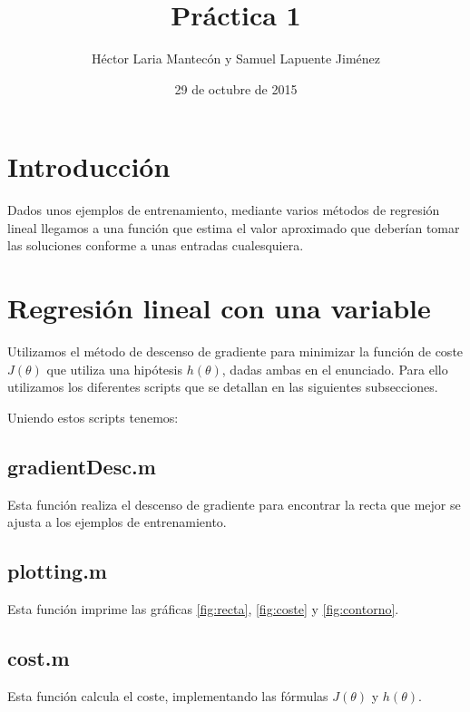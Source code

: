 \documentclass{article}
\title{Práctica 1}
\author{Héctor Laria Mantecón y Samuel Lapuente Jiménez}
\date{29 de octubre de 2015}
\begin{document}
\maketitle
\section{Introducción}
Dados unos ejemplos de entrenamiento, mediante varios métodos de regresión lineal llegamos a una función que estima el valor aproximado que deberían tomar las soluciones conforme a unas entradas cualesquiera.

\section{Regresión lineal con una variable}
Utilizamos el método de descenso de gradiente para minimizar la función de coste $J(\theta)$ que utiliza una hipótesis $h(\theta)$, dadas ambas en el enunciado. Para ello utilizamos los diferentes scripts que se detallan en las siguientes subsecciones.

Uniendo estos scripts tenemos:

\pagebreak

\subsection{gradientDesc.m}
Esta función realiza el descenso de gradiente para encontrar la recta que mejor se ajusta a los ejemplos de entrenamiento.

\pagebreak

\subsection{plotting.m}
Esta función imprime las gráficas \ref{fig:recta}, \ref{fig:coste} y \ref{fig:contorno}.


\subsection{cost.m}
Esta función calcula el coste, implementando las fórmulas $J(\theta)$ y $h(\theta)$.

\end{document}
